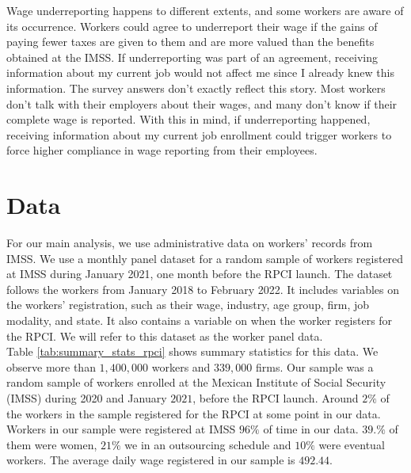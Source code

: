 \documentclass[10pt, oneside]{book}
\begin{document}
Wage underreporting happens to different extents, and some workers are aware of its occurrence. Workers could agree to underreport their wage if the gains of paying fewer taxes are given to them and are more valued than the benefits obtained at the IMSS. If underreporting was part of an agreement, receiving information about my current job would not affect me since I already knew this information. The survey answers don't exactly reflect this story. Most workers don't talk with their employers about their wages, and many don't know if their complete wage is reported. With this in mind, if underreporting happened, receiving information about my current job enrollment could trigger workers to force higher compliance in wage reporting from their employees.



\chapter{Data} \label{data}

For our main analysis, we use administrative data on workers' records from IMSS. We use a monthly panel dataset for a random sample of workers registered at IMSS during January 2021, one month before the RPCI launch. The dataset follows the workers from January 2018 to February 2022. It includes variables on the workers' registration, such as their wage, industry, age group, firm, job modality, and state. It also contains a variable on when the worker registers for the RPCI. We will refer to this dataset as the worker panel data. \\ 

Table \ref{tab:summary_stats_rpci} shows summary statistics for this data. We observe more than $1,400,000$ workers and $339,000$ firms. Our sample was a random sample of workers enrolled at the Mexican Institute of Social Security (IMSS) during 2020 and January $2021$, before the RPCI launch. Around $2\%$ of the workers in the sample registered for the RPCI at some point in our data. Workers in our sample were registered at IMSS $96\%$ of time in our data. $39.\%$ of them were women, $21\%$ we in an outsourcing schedule and $10\%$ were eventual workers. The average daily wage registered in our sample is $492.44$. \\
\end{document}
